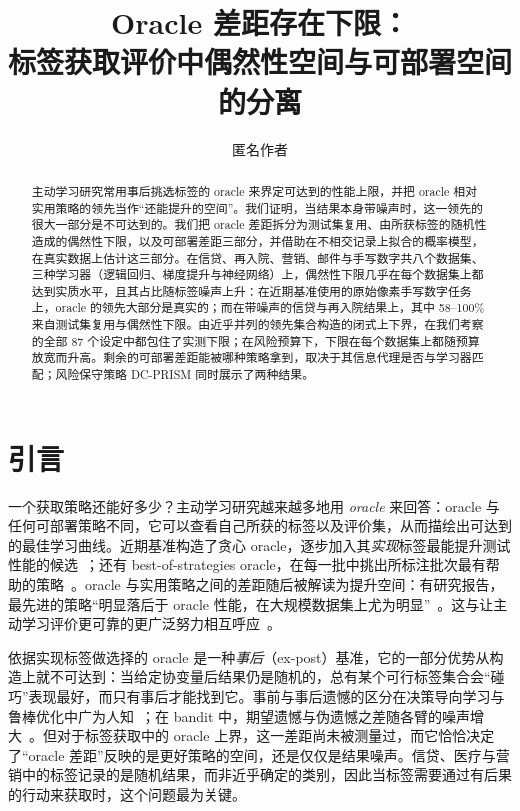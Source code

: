 \documentclass[runningheads]{llncs}
\begin{document}
\title{Oracle 差距存在下限：\\标签获取评价中偶然性空间与可部署空间的分离}
\author{匿名作者}
\maketitle
\begin{abstract}
主动学习研究常用事后挑选标签的 oracle 来界定可达到的性能上限，并把 oracle 相对实用策略的领先当作“还能提升的空间”。我们证明，当结果本身带噪声时，这一领先的很大一部分是不可达到的。我们把 oracle 差距拆分为测试集复用、由所获标签的随机性造成的偶然性下限，以及可部署差距三部分，并借助在不相交记录上拟合的概率模型，在真实数据上估计这三部分。在信贷、再入院、营销、邮件与手写数字共八个数据集、三种学习器（逻辑回归、梯度提升与神经网络）上，偶然性下限几乎在每个数据集上都达到实质水平，且其占比随标签噪声上升：在近期基准使用的原始像素手写数字任务上，oracle 的领先大部分是真实的；而在带噪声的信贷与再入院结果上，其中 58--100\% 来自测试集复用与偶然性下限。由近乎并列的领先集合构造的闭式上下界，在我们考察的全部 87 个设定中都包住了实测下限；在风险预算下，下限在每个数据集上都随预算放宽而升高。剩余的可部署差距能被哪种策略拿到，取决于其信息代理是否与学习器匹配；风险保守策略 DC-PRISM 同时展示了两种结果。
\end{abstract}

\section{引言}
\label{sec:intro}
一个获取策略还能好多少？主动学习研究越来越多地用 \emph{oracle} 来回答：oracle 与任何可部署策略不同，它可以查看自己所获的标签以及评价集，从而描绘出可达到的最佳学习曲线。近期基准构造了贪心 oracle，逐步加入其\emph{实现}标签最能提升测试性能的候选~\cite{werner2023comparable,werner2024cdalbench}；还有 best-of-strategies oracle，在每一批中挑出所标注批次最有帮助的策略~\cite{huseljic2026boss}。oracle 与实用策略之间的差距随后被解读为提升空间：有研究报告，最先进的策略“明显落后于 oracle 性能，在大规模数据集上尤为明显”~\cite{huseljic2026boss}。这与让主动学习评价更可靠的更广泛努力相互呼应~\cite{luth2023navigating,ji2023randomness}。

依据实现标签做选择的 oracle 是一种\emph{事后}（ex-post）基准，它的一部分优势从构造上就不可达到：当给定协变量后结果仍是随机的，总有某个可行标签集合会“碰巧”表现最好，而只有事后才能找到它。事前与事后遗憾的区分在决策导向学习与鲁棒优化中广为人知~\cite{schutte2023robust}；在 bandit 中，期望遗憾与伪遗憾之差随各臂的噪声增大~\cite{bubeck2012regret,audibert2010regret}。但对于标签获取中的 oracle 上界，这一差距尚未被测量过，而它恰恰决定了“oracle 差距”反映的是更好策略的空间，还是仅仅是结果噪声。信贷、医疗与营销中的标签记录的是随机结果，而非近乎确定的类别，因此当标签需要通过有后果的行动来获取时，这个问题最为关键。
\end{document}
